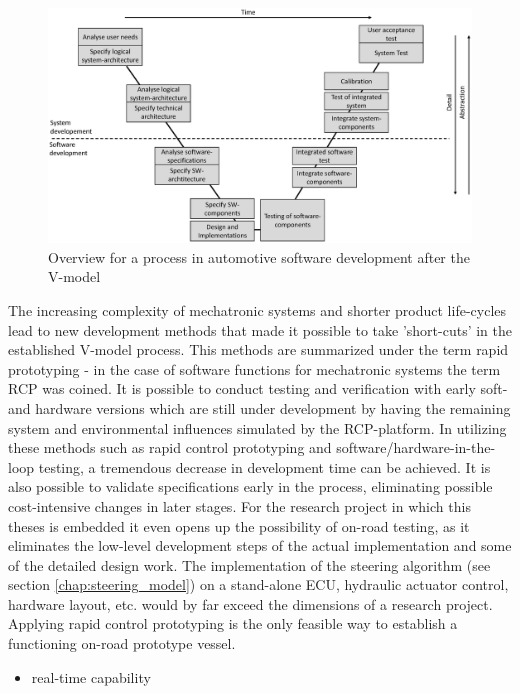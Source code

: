 \documentclass[ExampleMasters.tex]{subfiles}
\begin{document}
\begin{figure}[!htb]
	\centering
	\includegraphics[width=0.9\linewidth]{figures/v_model/Folie1}
	\caption{Overview for a process in automotive software development after the V-model}
	\label{fig:v_model}
\end{figure}



The increasing complexity of mechatronic systems and shorter product life-cycles lead to new development methods that made it possible to take 'short-cuts' in the established V-model process. This methods are summarized under the term rapid prototyping - in the case of software functions for mechatronic systems the term \gls{RCP} was coined. It is possible to conduct testing and verification with early soft- and hardware versions which are still under development by having the remaining system and environmental influences simulated by the \gls{RCP}-platform. In utilizing these methods such as rapid control prototyping and software/hardware-in-the-loop testing, a tremendous decrease in development time can be achieved. It is also possible to validate specifications early in the process, eliminating possible cost-intensive changes in later stages.\cite{rapidcontrolprototyping} For the research project in which this theses is embedded it even opens up the possibility of on-road testing, as it eliminates the low-level development steps of the actual implementation and some of the detailed design work. The implementation of the steering algorithm (see section \ref{chap:steering_model}) on a stand-alone ECU, hydraulic actuator control, hardware layout, etc. would by far exceed the dimensions of a research project. Applying rapid control prototyping is the only feasible way to establish a functioning on-road prototype vessel.


\begin{itemize}

	\item real-time capability
	
\end{itemize}
\end{document}
